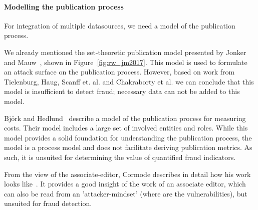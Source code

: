 \documentclass{ou-report}
\begin{document}




\paragraph{Modelling the publication process} \label{rw_publication_process}
For integration of multiple datasources, we need a model of the publication 
process.

We already mentioned the set-theoretic publication model presented by 
Jonker and Mauw~\cite{JM2017}, shown in Figure~\ref{fig:rw_jm2017}. This model
is used to formulate an attack surface on the publication process. However, 
based on work from Tielenburg, Haug, Scanff et. al. and Chakraborty et al. we 
can conclude that this model is insufficient to detect fraud; necessary data can 
not be added to this model.

Björk and Hedlund~\cite{BH2004} describe a  model of the publication process
for measuring costs. Their model includes a large set of involved entities
and roles. While this model provides a solid foundation for understanding the
publication process, the model is a process model and does not facilitate
deriving publication metrics. As such, it is unsuited for determining
the value of quantified fraud indicators.

From the view of the associate-editor, Cormode describes in detail how his work
looks like~\cite{C2013}. It provides a good insight of the work of an associate 
editor, which can also be read from an 'attacker-mindset' (where are the 
vulnerabilities), but unsuited for fraud detection.

\end{document}
